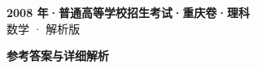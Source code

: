 \documentclass[zihao=-4, a4paper]{ctexart}
\begin{document}
\begin{center}
  {\Large\bfseries 2008 年·普通高等学校招生考试·重庆卷·理科}\\[4pt]
  {\large 数学 · 解析版}
\end{center}
\medskip
{}

\clearpage
{}
\begin{center}{\Large\bfseries 参考答案与详细解析}\end{center}
\medskip

\end{document}
